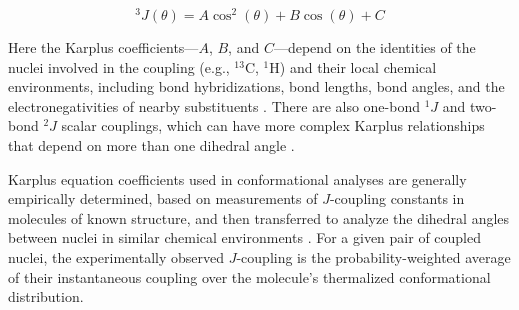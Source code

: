 \documentclass[9pt,review]{livecoms}
\begin{document}
\begin{equation}
\label{eqn:karplus}
^3J(\theta) = A \cos^2 (\theta) + B \cos (\theta) + C
\end{equation}

\noindent Here the Karplus coefficients---$A$, $B$, and $C$---depend on the identities of the nuclei involved in the coupling  (e.g., $^{13}$C, $^1$H) and their local chemical environments, including bond hybridizations, bond lengths, bond angles, and the electronegativities of nearby substituents \cite{haasnoot_relationship_1980}.
There are also one-bond $^1J$ and two-bond $^2J$ scalar couplings, which can have more complex Karplus relationships that depend on more than one dihedral angle \cite{vuister_use_1993,cornilescu_large_2000,wirmer_angular_2002,ding_protein_2004,gapsys_improved_2015}.

Karplus equation coefficients used in conformational analyses are generally empirically determined, based on measurements of $J$-coupling constants in molecules of known structure, and then transferred to analyze the dihedral angles between nuclei in similar chemical environments \cite{karplus_contact_1959,karplus_vicinal_1963,haasnoot_relationship_1980,wang_determination_1996,vogeli_limits_2007}.
For a given pair of coupled nuclei, the experimentally observed $J$-coupling is the probability-weighted average of their instantaneous coupling over the molecule’s thermalized conformational distribution.
\end{document}
